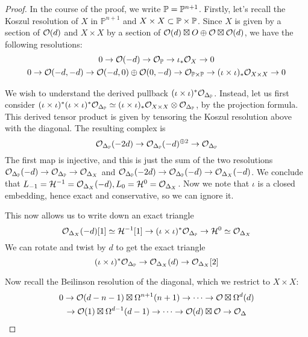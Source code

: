 \begin{proof}
    In the course of the proof, we write $\P=\mathbb{P}^{n+1}$. Firstly, let's recall the Koszul resolution of $X$ in $\mathbb{P}^{n+1}$ and $X\times X\subset \P\times \P$. Since $X$ is given by a section of $\O(d)$ and $X\times X$ by a section of $\O(d) \boxtimes O \oplus \O \boxtimes \O(d)$, we have the following resolutions: \begin{gather*}
        0\rightarrow \O(-d)\rightarrow \O_\P \rightarrow \iota_* \O_X\rightarrow 0\\
        0\rightarrow \O(-d,-d)\rightarrow \O(-d,0)\oplus \O(0,-d)\rightarrow \O_{\P\times \P}\rightarrow (\iota\times \iota)_* \O_{X\times X}\rightarrow 0
    \end{gather*}

    We wish to understand the derived pullback $(\iota\times \iota)^* \O_{\Delta_\P} $. Instead, let us first consider $(\iota\times \iota)^*(\iota\times \iota)^* \O_{\Delta_\P} \simeq (\iota\times \iota)_* \O_{X\times X} \otimes \O_{\Delta_\P}$, by the projection formula. This derived tensor product is given by tensoring the Koszul resolution above with the diagonal. The resulting complex is $$\O_{\Delta_\P}(-2d)\rightarrow \O_{\Delta_\P}(-d)^{\oplus 2}\rightarrow \O_{\Delta_\P}$$
    The first map is injective, and this is just the sum of the two resolutions $\O_{\Delta_\P}(-d)\rightarrow \O_{\Delta_\P}\rightarrow \O_{\Delta_X}$ and $\O_{\Delta_\P}(-2d)\rightarrow \O_{\Delta_\P}(-d)\rightarrow \O_{\Delta_X}(-d)$. We conclude that $L_{-1}=\calH^{-1}=\O_{\Delta_X}(-d), L_0=\calH^{0}=\O_{\Delta_X}$. Now we note that $\iota$ is a closed embedding, hence exact and conservative, so we can ignore it.

    This now allows us to write down an exact triangle $$\O_{\Delta_X}(-d)[1]\simeq \calH^{-1}[1]\rightarrow (\iota\times \iota)^*\O_{\Delta_\P}\rightarrow \calH^0\simeq \O_{\Delta_X}$$
    We can rotate and twist by $d$ to get the exact triangle 
    \begin{equation}\label{eqn:derivedtriangle}
        (\iota\times \iota)^*\O_{\Delta_\P}\rightarrow \O_{\Delta_X}(d)\rightarrow \O_{\Delta_X}[2]
    \end{equation}

    Now recall the Beilinson resolution of the diagonal, which we restrict to $X\times X$:\begin{gather*}
        0 \rightarrow \O (d-n-1)\boxtimes \Omega^{n+1}(n+1)\rightarrow \dots \rightarrow \O \boxtimes \Omega^{d}(d)\\
        \rightarrow \O(1)\boxtimes \Omega^{d-1}(d-1)\rightarrow \dots \rightarrow \O(d)\boxtimes \O \rightarrow \O_\Delta
    \end{gather*}


\end{proof}
